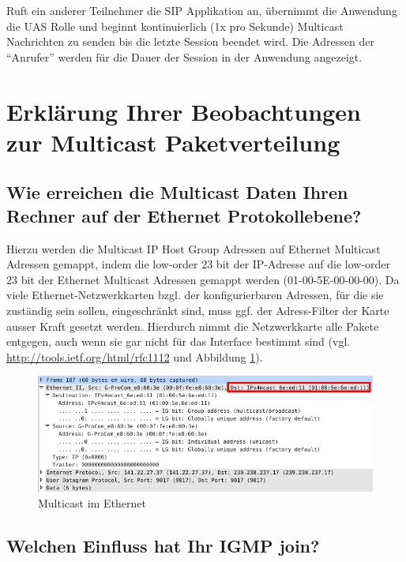 \documentclass[a4paper,10pt]{article}
\begin{document}
Ruft ein anderer Teilnehmer die SIP Applikation an, übernimmt die Anwendung die UAS Rolle und beginnt kontinuierlich (1x pro Sekunde) Multicast Nachrichten zu senden bis die letzte Session beendet wird. Die Adressen der "`Anrufer"' werden für die Dauer der Session in der Anwendung angezeigt.


\section{Erklärung Ihrer Beobachtungen zur Multicast Paketverteilung}

\subsection{Wie erreichen die Multicast Daten Ihren Rechner auf der Ethernet Protokollebene?}

Hierzu werden die Multicast IP Host Group Adressen auf Ethernet Multicast Adressen gemappt,
indem die low-order 23 bit der IP-Adresse auf die low-order 23 bit der Ethernet Multicast Adressen gemappt werden (01-00-5E-00-00-00).
Da viele Ethernet-Netzwerkkarten bzgl. der konfigurierbaren Adressen, für die sie zuständig sein sollen, eingeschränkt sind, muss ggf. der Adress-Filter der Karte ausser Kraft gesetzt werden.
Hierdurch nimmt die Netzwerkkarte alle Pakete entgegen, auch wenn sie gar nicht für das Interface bestimmt sind (vgl. \url{http://tools.ietf.org/html/rfc1112} und Abbildung \ref{multicast_ethernet}).

\begin{figure}[h]
	\begin{center}
		\includegraphics[width=1\textwidth]{multicast_ethernet.png}
	\end{center}

	\caption{Multicast im Ethernet}

	\label{multicast_ethernet}
\end{figure}

\subsection{Welchen Einfluss hat Ihr IGMP join?}
\end{document}

